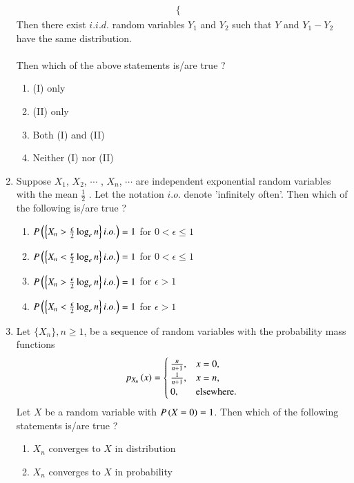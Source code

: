 \documentclass[journal]{IEEEtran}
\begin{document}
\begin{enumerate}
\begin{align*}
\begin{cases}
    \end{cases}
\end{align*}
Then there exist $i.i.d.$ random variables $Y_1$ and $Y_2$ such that $Y$ and
$Y_1 - Y_2$ have the same distribution. \\\\
Then which of the above statements is/are true ?
\begin{enumerate}
    \item (I) only
    \item (II) only
    \item Both (I) and (II)
    \item Neither (I) nor (II) \\
\end{enumerate}
\item Suppose $X_1$, $X_2$, $\cdots$ , $X_n$, $\cdots$ are independent exponential random variables with the mean $\frac{1}{2}$ . Let the notation $i.o.$ denote 'infinitely often'. Then which of the following is/are true ? 
\begin{enumerate}
    \item $P\left(\left\{X_n > \frac{\epsilon}{2}\log_en\right\}i.o.\right) = 1$ for $0 < \epsilon \leq 1$
    \item $P\left(\left\{X_n < \frac{\epsilon}{2}\log_en\right\}i.o.\right) = 1$ for $0 < \epsilon \leq 1$
    \item $P\left(\left\{X_n > \frac{\epsilon}{2}\log_en\right\}i.o.\right) = 1$ for $\epsilon > 1$
    \item $P\left(\left\{X_n < \frac{\epsilon}{2}\log_en\right\}i.o.\right) = 1$ for $\epsilon > 1$ \\ 
\end{enumerate}
\item Let $\{X_n\}, n \geq 1$, be a sequence of random variables with the probability mass functions
\begin{align*}
    p_{X_n}\left(x\right) = \begin{cases}
        \frac{n}{n+1}, & x = 0, \\
        \frac{1}{n+1}, & x = n, \\
        0, & \text{elsewhere}.
    \end{cases}
\end{align*}
Let $X$ be a random variable with $P\left(X = 0\right) = 1$. Then which of the following statements is/are true ? 
\begin{enumerate}
    \item $X_n$ converges to $X$ in distribution
    \item $X_n$ converges to $X$ in probability

\end{enumerate}
\end{enumerate}
\end{document}
